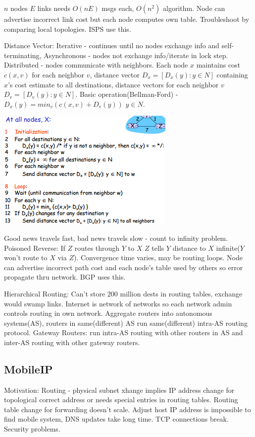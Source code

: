 \documentclass[9pt]{extarticle}
\begin{document}
\begin{multicols}{2}
$n$ nodes $E$ links needs $O(nE)$ msgs each, $O(n^2)$ algorithm. Node can advertise incorrect link cost but each node computes own table. Troubleshoot by comparing local topologies. ISPS use this.

Distance Vector: Iterative - continues until no nodes exchange info and self-terminating, Asynchronous - nodes not exchange info/iterate in lock step. Distributed - nodes communicate with neighbors. Each node $x$ maintains cost $c(x,v)$ for each neighbor $v$, distance vector $D_x =[D_x(y): y\in{N}]$ containing $x$’s cost estimate to all destinations, distance vectors for each neighbor $v$ $D_v = [D_v(y): y\in{N}]$. Basic operation(Bellman-Ford) - $D_x(y) = min_v{(c(x,v)+D_v(y))}$ $y\in{N}$. 

\includegraphics{distancevector.png}

Good news travels fast, bad news travels slow - count to infinity problem. Poisoned Reverse: If $Z$ routes through $Y$ to $X$ $Z$ tells $Y$ distance to $X$ infinite($Y$ won’t route to $X$ via $Z$). Convergence time varies, may be routing loops. Node can advertise incorrect path cost and each node’s table used by others so error propagate thru network. BGP uses this.

Hierarchical Routing: Can’t store 200 million dests in routing tables, exchange would swamp links. Internet is network of networks so each network admin controls routing in own network. Aggregate routers into autonomous systems(AS), routers in same(different) AS run same(different) intra-AS routing protocol. Gateway Routers: run intra-AS routing with other
routers in AS and inter-AS routing with other gateway routers.

\subsection{MobileIP}

Motivation: Routing -  physical subnet xhange implies IP address change for topological correct address or needs special entries in routing tables. Routing table change for forwarding  doesn't scale. Adjust host IP address is impossible to find mobile system, DNS updates take long time. TCP connections break. Security problems.


\end{multicols}
\end{document}
